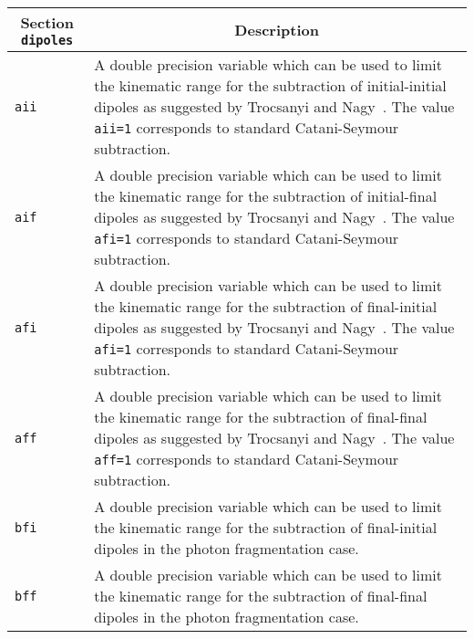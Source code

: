 	\begin{longtable}{p{1.5cm}p{12cm}}
		\toprule
		\multicolumn{1}{c}{{\textbf{Section} \texttt{dipoles}}} & \multicolumn{1}{c}{{\textbf{Description}}} \\ 
		\midrule
		{\tt aii} &
		A double precision variable which can be used to
		limit the kinematic range for the subtraction of initial-initial dipoles
		as suggested by Trocsanyi and Nagy~\cite{Nagy:2003tz}.   
		The value {\tt aii=1} corresponds 
		to standard Catani-Seymour subtraction.\\
		{\tt aif} &
		A double precision variable which can be used to
		limit the kinematic range for the subtraction of initial-final dipoles
		as suggested by Trocsanyi and Nagy~\cite{Nagy:2003tz}.   
		The value {\tt afi=1} corresponds 
		to standard Catani-Seymour subtraction.\\
		{\tt afi} &
		A double precision variable which can be used to
		limit the kinematic range for the subtraction of final-initial dipoles
		as suggested by Trocsanyi and Nagy~\cite{Nagy:2003tz}.   
		The value {\tt afi=1} corresponds 
		to standard Catani-Seymour subtraction.\\
		{\tt aff} &
		A double precision variable which can be used to
		limit the kinematic range for the subtraction of final-final dipoles
		as suggested by Trocsanyi and Nagy~\cite{Nagy:2003tz}.   
		The value {\tt aff=1} corresponds 
		to standard Catani-Seymour subtraction.\\
		{\tt bfi} &
		A double precision variable which can be used to
		limit the kinematic range for the subtraction of final-initial dipoles
		in the photon fragmentation case.\\
		{\tt bff} &
		A double precision variable which can be used to
		limit the kinematic range for the subtraction of final-final dipoles
		in the photon fragmentation case.\\
		\bottomrule
	\end{longtable}
